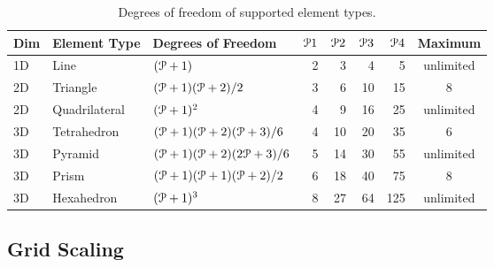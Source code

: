 \begin{table}
  \newcommand{\dofLine}{$(\PO+1)$}
  \newcommand{\dofTria}{$(\PO+1)(\PO+2)/2$}
  \newcommand{\dofQuad}{$(\PO+1)^2$}
  \newcommand{\dofTetr}{$(\PO+1)(\PO+2)( \PO+3)/6$}
  \newcommand{\dofPyra}{$(\PO+1)(\PO+2)(2\PO+3)/6$}
  \newcommand{\dofPris}{$(\PO+1)(\PO+1)( \PO+2)/2$}
  \newcommand{\dofHexa}{$(\PO+1)^3$}
  \centering
  \caption{Degrees of freedom of supported element types.}
  \label{TAB:Element_DoF}
    \begin{tabular}{lllrrrrc}
       Dim & Element Type  & Degrees of Freedom & %
       $\PO[1]$ & $\PO[2]$ & $\PO[3]$ & $\PO[4]$ & Maximum \PO{} \\
       \hline
       1D  & Line          & \dofLine &    2 &    3 &    4 &    5 & unlimited \\
       2D  & Triangle      & \dofTria &    3 &    6 &   10 &   15 & 8 \\
       2D  & Quadrilateral & \dofQuad &    4 &    9 &   16 &   25 & unlimited \\
       3D  & Tetrahedron   & \dofTetr &    4 &   10 &   20 &   35 & 6 \\
       3D  & Pyramid       & \dofPyra &    5 &   14 &   30 &   55 & unlimited \\
       3D  & Prism         & \dofPris &    6 &   18 &   40 &   75 & 8 \\
       3D  & Hexahedron    & \dofHexa &    8 &   27 &   64 &  125 & unlimited
    \end{tabular}
\end{table}




\subsection{Grid Scaling}
\label{SEC:Grid_Scaling}

